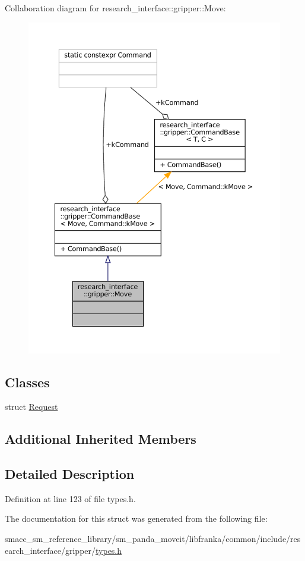 Collaboration diagram for research\+\_\+interface\+:\+:gripper\+:\+:Move\+:
\nopagebreak
\begin{figure}[H]
\begin{center}
\leavevmode
\includegraphics[width=350pt]{structresearch__interface_1_1gripper_1_1Move__coll__graph}
\end{center}
\end{figure}
\subsection*{Classes}
\begin{DoxyCompactItemize}
\item 
struct \hyperlink{structresearch__interface_1_1gripper_1_1Move_1_1Request}{Request}
\end{DoxyCompactItemize}
\subsection*{Additional Inherited Members}


\subsection{Detailed Description}


Definition at line 123 of file types.\+h.



The documentation for this struct was generated from the following file\+:\begin{DoxyCompactItemize}
\item 
smacc\+\_\+sm\+\_\+reference\+\_\+library/sm\+\_\+panda\+\_\+moveit/libfranka/common/include/research\+\_\+interface/gripper/\hyperlink{types_8h}{types.\+h}\end{DoxyCompactItemize}
